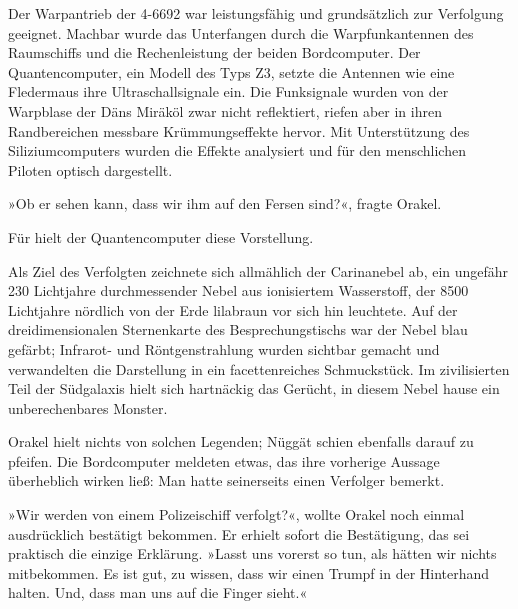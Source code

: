 Der Warpantrieb der 4-6692 war leistungsfähig und grundsätzlich zur Verfolgung geeignet. Machbar wurde das Unterfangen durch die Warpfunkantennen des Raumschiffs und die Rechenleistung der beiden Bordcomputer. Der Quantencomputer, ein Modell des Typs Z3, setzte die Antennen wie eine Fledermaus ihre Ultraschallsignale ein. Die Funksignale wurden von der Warpblase der Däns Miräköl zwar nicht reflektiert, riefen aber in ihren Randbereichen messbare Krümmungseffekte hervor. Mit Unterstützung des Siliziumcomputers wurden die Effekte analysiert und für den menschlichen Piloten optisch dargestellt.

»Ob er sehen kann, dass wir ihm auf den Fersen sind?«, fragte Orakel.

Für  hielt der Quantencomputer diese Vorstellung. 

Als Ziel des Verfolgten zeichnete sich allmählich der Carinanebel ab, ein ungefähr 230 Lichtjahre durchmessender Nebel aus ionisiertem Wasserstoff, der 8500 Lichtjahre nördlich von der Erde lilabraun vor sich hin leuchtete. Auf der dreidimensionalen Sternenkarte des Besprechungstischs war der Nebel blau gefärbt; Infrarot- und Röntgenstrahlung wurden sichtbar gemacht und verwandelten die Darstellung in ein facettenreiches Schmuckstück. Im zivilisierten Teil der Südgalaxis hielt sich hartnäckig das Gerücht, in diesem Nebel hause ein unberechenbares Monster.

Orakel hielt nichts von solchen Legenden; Nüggät schien ebenfalls darauf zu pfeifen. Die Bordcomputer meldeten etwas, das ihre vorherige Aussage überheblich wirken ließ: Man hatte seinerseits einen Verfolger bemerkt.


»Wir werden von einem Polizeischiff verfolgt?«, wollte Orakel noch einmal ausdrücklich bestätigt bekommen. Er erhielt sofort die Bestätigung, das sei praktisch die einzige Erklärung. »Lasst uns vorerst so tun, als hätten wir nichts mitbekommen. Es ist gut, zu wissen, dass wir einen Trumpf in der Hinterhand halten. Und, dass man uns auf die Finger sieht.«

